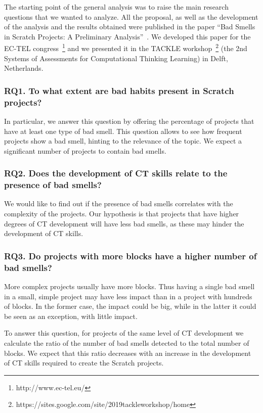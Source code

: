 The starting point of the general analysis was to raise the main research questions that we wanted to analyze. All the proposal, as well as the development of the analysis and the results obtained were published in the paper ``Bad Smells in Scratch Projects: A Preliminary Analysis''~\cite{vargas2019bad}. We developed this paper for the EC-TEL congress~\footnote{http://www.ec-tel.eu/} and we presented it in the TACKLE workshop~\footnote{https://sites.google.com/site/2019tackleworkshop/home} (the 2nd Systems of Assessments for Computational Thinking Learning) in Delft, Netherlands.

\subsubsection{RQ1. To what extent are bad habits present in Scratch projects?}
\label{subsubsec:RQ1}

In particular, we answer this question by offering the percentage of projects that have at least one type of bad smell. This question allows to see how frequent projects show a bad smell, hinting to the relevance of the topic. We expect a significant number of projects to contain bad smells.

\subsubsection{RQ2. Does the development of CT skills relate to the presence of bad smells?}
\label{subsubsec:RQ2}

We would like to find out if the presence of bad smells correlates with the complexity of the projects. Our hypothesis is that projects that have higher degrees of CT development will have less bad smells, as these may hinder the development of CT skills.

\subsubsection{RQ3. Do projects with more blocks have a higher number of bad smells?}
\label{subsubsec:RQ3}

More complex projects usually have more blocks. Thus having a single bad smell in a small, simple project may have less impact than in a project with hundreds of blocks. In the former case, the impact could be big, while in the latter it could be seen as an exception, with little impact.

To answer this question, for projects of the same level of CT development we calculate the ratio of the number of bad smells detected to the total number of blocks. We expect that this ratio decreases with an increase in the development of CT skills required to create the Scratch projects.

